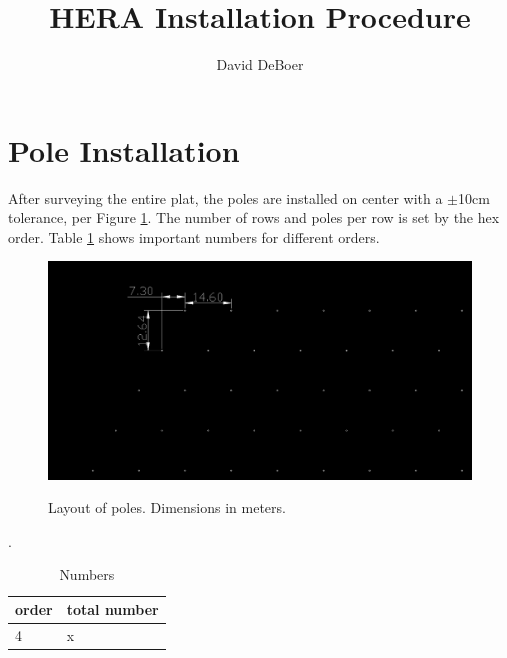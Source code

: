 \documentclass[11pt]{article}
\begin{document}
\title{HERA Installation Procedure}
\author{David DeBoer}
\maketitle

\setcounter{tocdepth}{3}
\tableofcontents

\section{Pole Installation}
After surveying the entire plat, the poles are installed on center with a $\pm$10cm tolerance, per Figure \ref{fig:poles}.  The number of rows and poles per row is set by the hex order.  Table \ref{tab:hexnums} shows important numbers for different orders.
\begin{figure}[H]
\centering
\includegraphics[width=\textwidth]{graphics/bigPoles.png}
\label{fig:poles}
\caption{Layout of poles.  Dimensions in meters.}
\end{figure}

\begin{table}[H]
\centering
\caption{Numbers}.
\begin{tabular}{| l | l |} \hline
order & total number \\ \hline
4 & x \\ \hline
\end{tabular}
\label{tab:hexnums}
\end{table}
\end{document}
